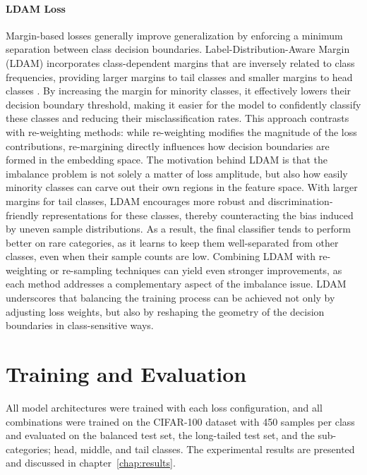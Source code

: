 \paragraph{LDAM Loss}
Margin-based losses generally improve generalization by enforcing a minimum separation between class decision boundaries. Label-Distribution-Aware
Margin (LDAM)  \cite{cao2019learningimbalanceddatasetslabeldistributionaware}incorporates class-dependent margins that are inversely related to class frequencies, providing larger margins to tail classes and smaller margins to head classes \cite{zhang2023deep}. By increasing the margin for minority classes, it effectively lowers their decision boundary threshold, making it easier for the model to confidently classify these classes and reducing their misclassification rates. This approach contrasts with re-weighting methods: while re-weighting modifies the magnitude of the loss contributions, re-margining directly influences how decision boundaries are formed in the embedding space. The motivation behind LDAM is that the imbalance problem is not solely a matter of loss amplitude, but also how easily minority classes can carve out their own regions in the feature space. With larger margins for tail classes, LDAM encourages more robust and discrimination-friendly representations for these classes, thereby counteracting the bias induced by uneven sample distributions. As a result, the final classifier tends to perform better on rare categories, as it learns to keep them well-separated from other classes, even when their sample counts are low. Combining LDAM with re-weighting or re-sampling techniques can yield even stronger improvements, as each method addresses a complementary aspect of the imbalance issue. LDAM underscores that balancing the training process can be achieved not only by adjusting loss weights, but also by reshaping the geometry of the decision boundaries in class-sensitive ways.


\section{Training and Evaluation}

All model architectures were trained with each loss configuration, and all combinations were trained on the CIFAR-100 dataset with 450 samples per class and evaluated on the balanced test set, the long-tailed test set, and the sub-categories; head, middle, and tail classes. The experimental results are presented and discussed in chapter~\ref{chap:results}.

